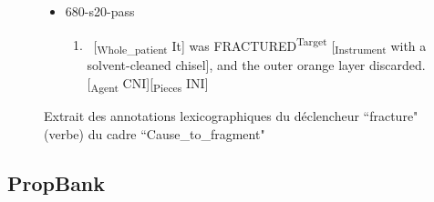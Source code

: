 \documentclass[xcolor=table]{beamer}
\begin{document}
\begin{frame}
\begin{figure}
\begin{tcolorbox}[colback=white, colframe=blue, boxrule=1pt, text width=.91\textwidth]
\begin{itemize}
			\item 680-s20-pass
			\begin{enumerate}\tiny
				\item \ [\textsubscript{\color{red}Whole\_patient} It] was FRACTURED\textsuperscript{\color{red}Target} [\textsubscript{\color{red}Instrument} with a solvent-cleaned chisel], and the outer orange layer discarded. [\textsubscript{\color{red}Agent} CNI][\textsubscript{\color{red}Pieces} INI] 
			\end{enumerate}
			
		\end{itemize}\vspace{-6pt}
	\end{tcolorbox}

		\caption{Extrait des annotations lexicographiques du déclencheur ``fracture" (verbe) du cadre ``Cause\_to\_fragment"}
	\end{figure}
	
\end{frame}

\subsection{PropBank}
\end{document}
